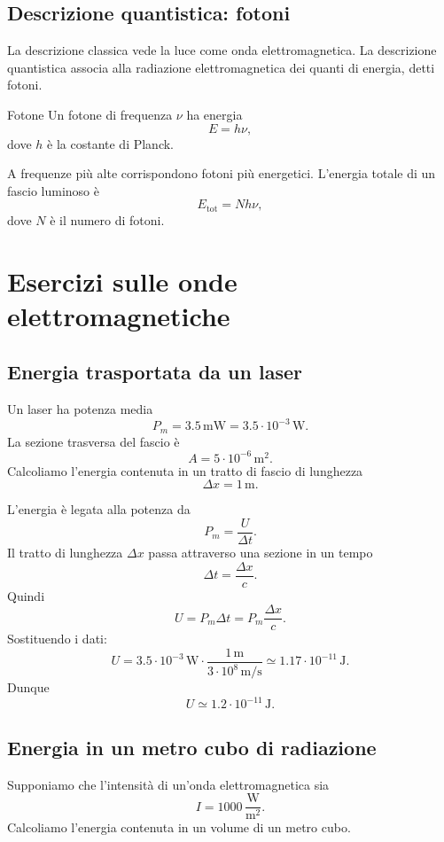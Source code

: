 \documentclass[a4paper]{article}
\begin{document}
\subsection{Descrizione quantistica: fotoni}

La descrizione classica vede la luce come onda elettromagnetica. La descrizione quantistica associa alla radiazione elettromagnetica dei quanti di energia, detti fotoni.

\begin{snippetdefinition}{Fotone}
Un fotone di frequenza \(\nu\) ha energia
\[
    E=h\nu,
\]
dove \(h\) è la costante di Planck.
\end{snippetdefinition}

A frequenze più alte corrispondono fotoni più energetici. L'energia totale di un fascio luminoso è
\[
E_{\mathrm{tot}}=N h\nu,
\]
dove \(N\) è il numero di fotoni.

\section{Esercizi sulle onde elettromagnetiche}

\subsection{Energia trasportata da un laser}

Un laser ha potenza media
\[
P_m=3.5\,\mathrm{mW}=3.5\cdot 10^{-3}\,\mathrm{W}.
\]
La sezione trasversa del fascio è
\[
A=5\cdot 10^{-6}\,\mathrm{m}^2.
\]
Calcoliamo l'energia contenuta in un tratto di fascio di lunghezza
\[
\Delta x=1\,\mathrm{m}.
\]

\begin{snippetsolution}{}
L'energia è legata alla potenza da
\[
    P_m=\frac{U}{\Delta t}.
\]
Il tratto di lunghezza \(\Delta x\) passa attraverso una sezione in un tempo
\[
    \Delta t=\frac{\Delta x}{c}.
\]
Quindi
\[
    U=P_m\Delta t=P_m\frac{\Delta x}{c}.
\]
Sostituendo i dati:
\[
    U=3.5\cdot 10^{-3}\,\mathrm{W}\cdot \frac{1\,\mathrm{m}}{3\cdot 10^8\,\mathrm{m/s}}
    \simeq 1.17\cdot 10^{-11}\,\mathrm{J}.
\]
Dunque
\[
    U\simeq 1.2\cdot 10^{-11}\,\mathrm{J}.
\]
\end{snippetsolution}

\subsection{Energia in un metro cubo di radiazione}

Supponiamo che l'intensità di un'onda elettromagnetica sia
\[
I=1000\,\frac{\mathrm{W}}{\mathrm{m}^2}.
\]
Calcoliamo l'energia contenuta in un volume di un metro cubo.
\end{document}
